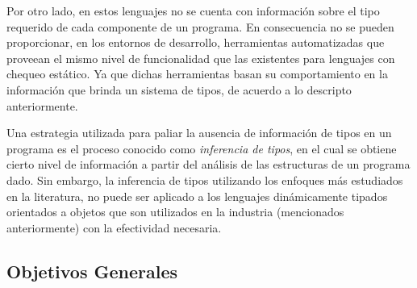 \documentclass[a4paper,10pt]{article}
\begin{document}

Por otro lado, en estos lenguajes no se cuenta con información sobre el tipo requerido de cada componente de un programa. En consecuencia no se pueden proporcionar, en los entornos de desarrollo, herramientas automatizadas que proveean el mismo nivel de funcionalidad que las existentes para lenguajes con chequeo estático. Ya que dichas herramientas basan su comportamiento en la información que brinda un sistema de tipos, de acuerdo a lo descripto anteriormente.

%

Una estrategia utilizada para paliar la ausencia de información de tipos en un programa es el proceso conocido como \emph{inferencia de tipos}\cite{Miln78a}, en el cual se obtiene cierto nivel de información a partir del análisis de las estructuras de un programa dado.
Sin embargo, la inferencia de tipos utilizando los enfoques más estudiados en la literatura, no puede ser aplicado a los lenguajes dinámicamente tipados orientados a objetos que son utilizados en la industria (mencionados anteriormente) con la efectividad necesaria.



\subsection{Objetivos Generales}
\end{document}
